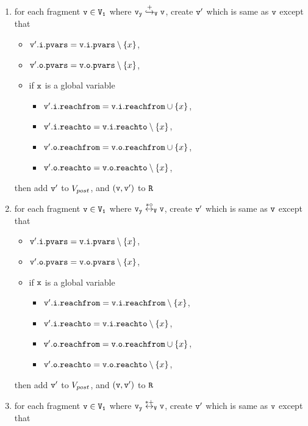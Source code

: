 \begin{itemize}
\begin{enumerate}
\item for each fragment $\tt v \in V_1$ where $\tt \mathtt{v}_y \overset{+}\hookrightarrow_{V} v$, create $\tt v'$ which is same as $\tt v$ except that
\begin{itemize}
\item $\mathtt{v}'.\mathtt{i}.\mathtt{pvars} = \mathtt{v}.\mathtt{i}.\mathtt{pvars} \setminus \left\{x\right\}$,
\item $\mathtt{v}'.\mathtt{o}.\mathtt{pvars} = \mathtt{v}.\mathtt{o}.\mathtt{pvars} \setminus \left\{x\right\}$,
\item if $\tt x$ is a global variable
\begin{itemize}
\item $\mathtt{v}'.\mathtt{i}.\mathtt{reachfrom} = \mathtt{v}.\mathtt{i}.\mathtt{reachfrom} \cup \left\{x\right\}$,
\item $\mathtt{v}'.\mathtt{i}.\mathtt{reachto} = \mathtt{v}.\mathtt{i}.\mathtt{reachto} \setminus \left\{x\right\}$,
 \item $\mathtt{v}'.\mathtt{o}.\mathtt{reachfrom} = \mathtt{v}.\mathtt{o}.\mathtt{reachfrom} \cup \left\{x\right\}$,
 \item $\mathtt{v}'.\mathtt{o}.\mathtt{reachto} = \mathtt{v}.\mathtt{o}.\mathtt{reachto} \setminus \left\{x\right\}$,
\end{itemize}
\end{itemize}
then add $\tt v'$ to $V_{post}$, and $\tt (v,v')$ to $\tt R$
\item for each fragment $\tt v \in V_1$ where $\tt \mathtt{v}_y \overset{*\circ}\leftrightarrow_{V} v$, create $\tt v'$ which is same as $\tt v$ except that
\begin{itemize}
\item $\mathtt{v}'.\mathtt{i}.\mathtt{pvars} = \mathtt{v}.\mathtt{i}.\mathtt{pvars} \setminus \left\{x\right\}$,
\item $\mathtt{v}'.\mathtt{o}.\mathtt{pvars} = \mathtt{v}.\mathtt{o}.\mathtt{pvars} \setminus \left\{x\right\}$,
\item if $\tt x$ is a global variable
\begin{itemize}
\item $\mathtt{v}'.\mathtt{i}.\mathtt{reachfrom} = \mathtt{v}.\mathtt{i}.\mathtt{reachfrom} \setminus \left\{x\right\}$,
\item $\mathtt{v}'.\mathtt{i}.\mathtt{reachto} = \mathtt{v}.\mathtt{i}.\mathtt{reachto} \setminus \left\{x\right\}$,
\item $\mathtt{v}'.\mathtt{o}.\mathtt{reachfrom} = \mathtt{v}.\mathtt{o}.\mathtt{reachfrom} \cup \left\{x\right\}$,
\item $\mathtt{v}'.\mathtt{o}.\mathtt{reachto} = \mathtt{v}.\mathtt{o}.\mathtt{reachto} \setminus \left\{x\right\}$,
\end{itemize}
\end{itemize}
then add $\tt v'$ to $V_{post}$, and $\tt (v,v')$ to $\tt R$
\item for each fragment $\tt v \in V_1$ where $\tt \mathtt{v}_y \overset{*+}\leftrightarrow_{V} v$, create $\tt v'$ which is same as $\tt v$ except that 

\end{enumerate}
\end{itemize}

